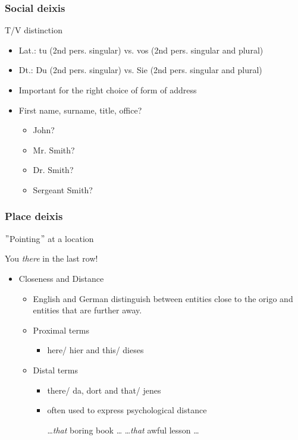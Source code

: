 \documentclass[12pt, table]{beamer}
\begin{document}
\begin{frame}
\frametitle{Social deixis}
T/V distinction
\begin{itemize}
\item Lat.: tu (2nd pers. singular) vs. vos (2nd pers. singular and plural)
\item Dt.: Du (2nd pers. singular) vs. Sie (2nd pers. singular and plural)
\item Important for the right choice of form of address
\item First name, surname, title, office?
\begin{itemize}
\item John? 
\item Mr. Smith? 
\item Dr. Smith? 
\item Sergeant Smith?
\end{itemize}
\end{itemize}
\end{frame}

\begin{frame}
\frametitle{Place deixis}
$"$Pointing$"$ at a location
\begin{exe}
\ex You \textit{there} in the last row!
\end{exe}
\begin{itemize}
\item Closeness and Distance
\begin{itemize}
\item English and German distinguish between entities close to the origo and entities that are further away.
\item Proximal terms
\begin{itemize}
\item here/ hier and this/ dieses
\end{itemize}
\item Distal terms
\begin{itemize}
\item there/ da, dort and that/ jenes
\item often used to express psychological distance
\begin{exe}
\ex \dots \textit{that} boring book \dots
\ex \dots \textit{that} awful lesson \dots
\end{exe}
\end{itemize}
\end{itemize}
\end{itemize}
\end{frame}
\end{document}
